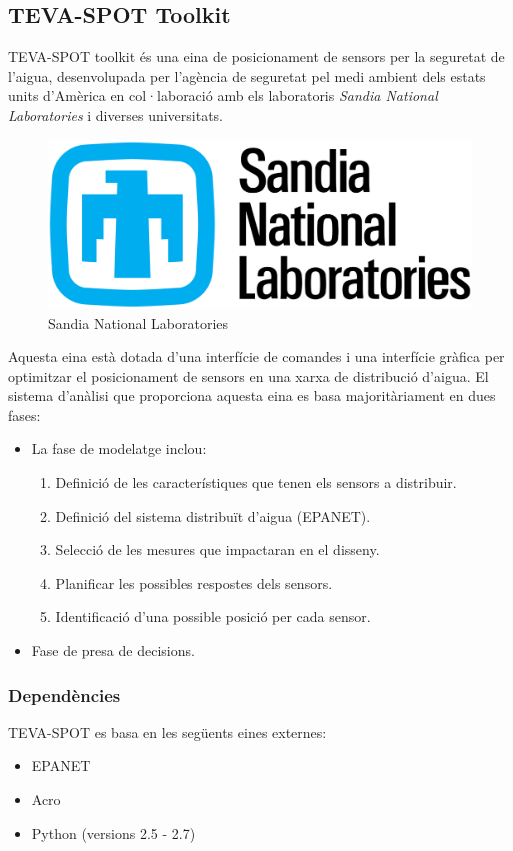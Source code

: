 \documentclass[12pt]{article}
\begin{document}
\subsection{TEVA-SPOT Toolkit}
TEVA-SPOT toolkit és una eina de posicionament de sensors per la seguretat de l'aigua, desenvolupada per l'agència de seguretat pel medi ambient dels estats units d'Amèrica en col·laboració amb els laboratoris \textit{Sandia National Laboratories} i diverses universitats.

\begin{figure}[h!]
	\centering
	\includegraphics[scale=0.3]{imatges/snlabs.png}
	\caption{Sandia National Laboratories}
\end{figure}

Aquesta eina està dotada d'una interfície de comandes i una interfície gràfica per optimitzar el posicionament de sensors en una xarxa de distribució d'aigua. El sistema d'anàlisi que proporciona aquesta eina es basa majoritàriament en dues fases:
\begin{itemize}
	\item La fase de modelatge inclou:
	\begin{enumerate}
		\item Definició de les característiques que tenen els sensors a distribuir.
		\item Definició del sistema distribuït d'aigua (EPANET).
		\item Selecció de les mesures que impactaran en el disseny.
		\item Planificar les possibles respostes dels sensors.
		\item Identificació d'una possible posició per cada sensor.
	\end{enumerate}
	\item Fase de presa de decisions.
\end{itemize}

\subsubsection{Dependències}
TEVA-SPOT es basa en les següents eines externes:
\begin{itemize}
	\item EPANET
	\item Acro
	\item Python (versions 2.5 - 2.7)
\end{itemize}
\end{document}
